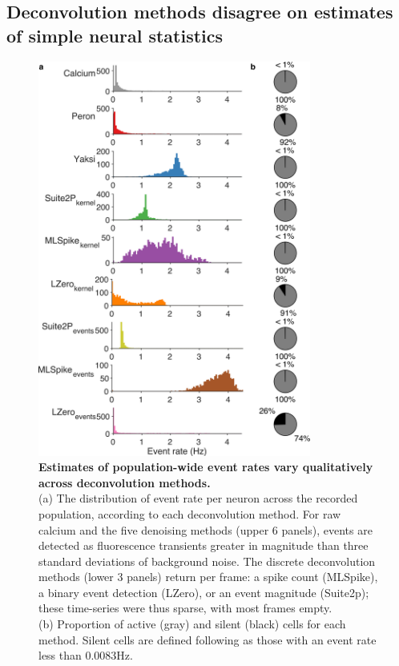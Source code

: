 \documentclass[a4paper,11pt]{article}
\begin{document}
\subsection{Deconvolution methods disagree on estimates of simple neural statistics}
\begin{figure}
	\centering
	\includegraphics[width=0.8\textwidth]{composite_figs/fig4_event_rate.png}
	\caption{\label{fig:simple_stats} \textbf{Estimates of population-wide event rates vary qualitatively across deconvolution methods.} \\
		(a) The distribution of event rate per neuron across the recorded population, according to each deconvolution method. For raw calcium and the five denoising methods (upper 6 panels), events are detected as fluorescence transients greater in magnitude than three standard deviations of background noise. The discrete deconvolution methods (lower 3 panels) return per frame: a spike count (MLSpike), a binary event detection (LZero), or an event magnitude (Suite2p); these time-series were thus sparse, with most frames empty. \\  
		(b)  Proportion of active (gray) and silent (black) cells for each method. Silent cells are defined following \citep{Peron2015-kd} as those with an event rate less than 0.0083Hz.}
\end{figure}
\end{document}
